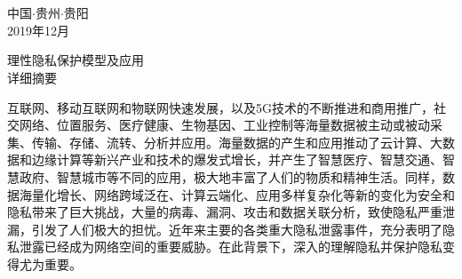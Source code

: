 \documentclass[pdftex,notypeinfo,twoside,openany,UTF8,fntef]{CASthesis}
\theoremstyle{THrm}{
	\newtheorem{question}{Question}[section]
	\newtheorem{property}{性质}[section]
	\newtheorem{assumption}{假设}[section]
	\newtheorem{claim}[lemma]{断言}
	
}
\begin{document}

  \titlepage
  \newpage\thispagestyle{empty}
  
  
  \vspace*{10pt}
  \begin{center}
   	\heiti{}\\
   	\heiti{}\\
   	\heiti{}
  \end{center}
  
  \vspace*{80pt}
  \begin{center}
  	\heiti{}
  \end{center}
  
  \vspace*{160pt}
  \begin{center}
  	\heiti{}
  \end{center}
  
  \vspace*{50pt}
  
  \begin{center}
  	\heiti{}
  	{中国$\cdot$贵州$\cdot$贵阳\\2019年12月}
  \end{center}


\newpage
\pagestyle{plain}
\begin{center}
	\heiti{}
	{理性隐私保护模型及应用}\\
	\heiti{}
	{详细摘要}
\end{center}

互联网、移动互联网和物联网快速发展，以及5G技术的不断推进和商用推广，社交网络、位置服务、医疗健康、生物基因、工业控制等海量数据被主动或被动采集、传输、存储、流转、分析并应用。海量数据的产生和应用推动了云计算、大数据和边缘计算等新兴产业和技术的爆发式增长，并产生了智慧医疗、智慧交通、智慧政府、智慧城市等不同的应用，极大地丰富了人们的物质和精神生活。同样，数据海量化增长、网络跨域泛在、计算云端化、应用多样复杂化等新的变化为安全和隐私带来了巨大挑战，大量的病毒、漏洞、攻击和数据关联分析，致使隐私严重泄漏，引发了人们极大的担忧。近年来主要的各类重大隐私泄露事件，充分表明了隐私泄露已经成为网络空间的重要威胁。在此背景下，深入的理解隐私并保护隐私变得尤为重要。
\end{document}
